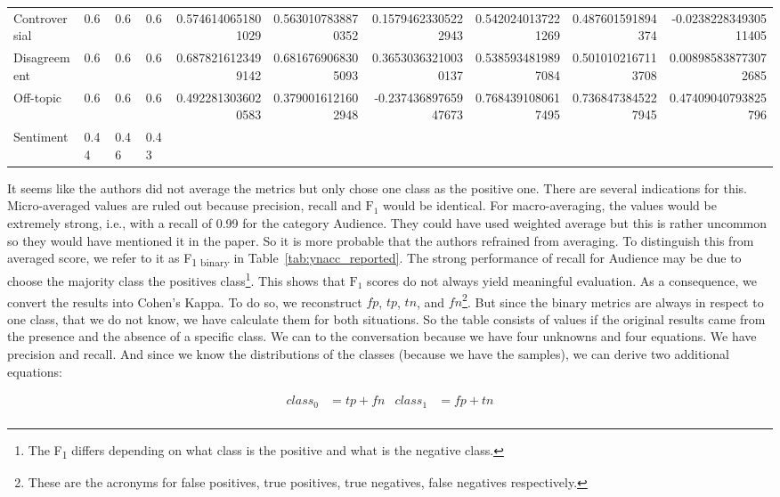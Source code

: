 \begin{table}
\begin{tabular}{l l l l  n{1}{3} n{1}{3} n{1}{3} n{1}{3} n{1}{3} n{1}{3}}
Controversial & $0.67$ & $0.64$ & $0.65$ & 0.5746140651801029 & 0.5630107838870352 & 0.15794623305222943 & 0.5420240137221269 & 0.487601591894374 & -0.023822834930511405 \\
Disagreement & $0.60$ & $0.68$ & $0.64$ & 0.6878216123499142 & 0.6816769068305093 & 0.36530363210030137 & 0.5385934819897084 & 0.5010102167113708 & 0.008985838773072685 \\
Off-topic & $0.62$ & $0.67$ & $0.61$ & 0.4922813036020583 & 0.3790016121602948 & -0.23743689765947673 & 0.7684391080617495 & 0.7368473845227945 & 0.47409040793825796 \\
Sentiment & 0.44 & 0.46 & 0.43 \\
\bottomrule
\end{tabular}
\end{table}

It seems like the authors did not average the metrics but only chose one class as the positive one. There are several indications for this. Micro-averaged values are ruled out because precision, recall and $\text{F}_{1}$ would be identical.
For macro-averaging, the values would be extremely strong, i.e., with a recall of 0.99 for the category Audience. They could have used weighted average but this is rather uncommon so they would have mentioned it in the paper. So it is more probable that the authors refrained from averaging.
To distinguish this from averaged score, we refer to it as F\textsubscript{1 binary}  in Table~\ref{tab:ynacc_reported}.
The strong performance of recall for Audience may be due to choose the majority class the positives class\footnote{The F\textsubscript{1} differs depending on what class is the positive and what is the negative class.}.
This shows that $\text{F}_{1}$ scores do not always yield meaningful evaluation. As a consequence, we convert the results into Cohen's Kappa. To do so, we reconstruct $fp$, $tp$, $tn$, and $fn$\footnote{These are the acronyms for false positives, true positives, true negatives, false negatives respectively.}. But since the binary metrics are always in respect to one class, that we do not know, we have calculate them for both situations.
So the table consists of values if the original results came from the presence and the absence of a specific class.
We can to the conversation because we have four unknowns and four equations. We have precision and recall.
And since we know the distributions of the classes (because we have the samples), we can derive two additional equations:

\begin{align*}
    class_0 &= tp+fn & class_1 &= fp+tn\\
\end{align*}

